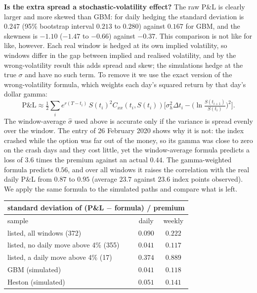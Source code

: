 \documentclass[11pt,a4paper]{article}
\begin{document}
\textbf{Is the extra spread a stochastic-volatility effect?} The raw P\&L is clearly larger and more skewed than GBM: for daily hedging the standard deviation is $0.247$ (95\% bootstrap interval $0.213$ to $0.280$) against $0.167$ for GBM, and the skewness is $-1.10$ ($-1.47$ to $-0.66$) against $-0.37$. This comparison is not like for like, however. Each real window is hedged at its own implied volatility, so windows differ in the gap between implied and realised volatility, and by the wrong-volatility result this adds spread and skew; the simulations hedge at the true $\sigma$ and have no such term. To remove it we use the exact version of the wrong-volatility formula, which weights each day's squared return by that day's dollar gamma:
\[
\text{P\&L}\approx\tfrac12\sum_i e^{r(T-t_i)}\,S(t_i)^2C_{xx}(t_i,S(t_i))\Big[\sigma_h^2\Delta t_i-\Big(\ln\tfrac{S(t_{i+1})}{S(t_i)}\Big)^2\Big].
\]
The window-average $\hat\sigma$ used above is accurate only if the variance is spread evenly over the window. The entry of 26 February 2020 shows why it is not: the index crashed while the option was far out of the money, so its gamma was close to zero on the crash days and they cost little, yet the window-average formula predicts a loss of $3.6$ times the premium against an actual $0.44$. The gamma-weighted formula predicts $0.56$, and over all windows it raises the correlation with the real daily P\&L from $0.87$ to $0.95$ (average $23.7$ against $23.6$ index points observed). We apply the same formula to the simulated paths and compare what is left.

\begin{center}\small
\begin{tabular}{lcc}
\toprule
\multicolumn{3}{c}{standard deviation of (P\&L $-$ formula) / premium} \\
\midrule
sample & daily & weekly \\
\midrule
listed, all windows (372)              & $0.090$ & $0.222$ \\
listed, no daily move above 4\% (355)  & $0.041$ & $0.117$ \\
listed, a daily move above 4\% (17)    & $0.374$ & $0.889$ \\
GBM (simulated)                        & $0.041$ & $0.118$ \\
Heston (simulated)                     & $0.051$ & $0.141$ \\
\bottomrule
\end{tabular}
\end{center}
\end{document}
